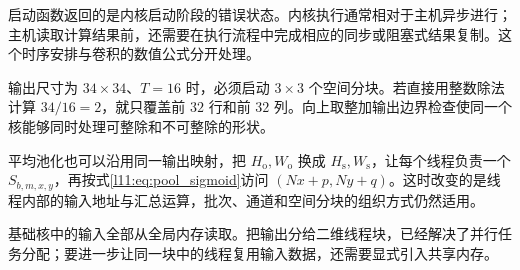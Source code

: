 \noindent\begin{minipage}{\linewidth}

\end{minipage}

启动函数返回的是内核启动阶段的错误状态。内核执行通常相对于主机异步进行；主机读取计算结果前，还需要在执行流程中完成相应的同步或阻塞式结果复制。这个时序安排与卷积的数值公式分开处理。

输出尺寸为 $34\times34$、$T=16$ 时，必须启动 $3\times3$ 个空间分块。若直接用整数除法计算 $34/16=2$，就只覆盖前 $32$ 行和前 $32$ 列。向上取整加输出边界检查使同一个核能够同时处理可整除和不可整除的形状。

平均池化也可以沿用同一输出映射，把 $H_{\mathrm{o}},W_{\mathrm{o}}$ 换成 $H_{\mathrm{s}},W_{\mathrm{s}}$，让每个线程负责一个 $S_{b,m,x,y}$，再按式\eqref{l11:eq:pool_sigmoid}访问 $(Nx+p,Ny+q)$。这时改变的是线程内部的输入地址与汇总运算，批次、通道和空间分块的组织方式仍然适用。

基础核中的输入全部从全局内存读取。把输出分给二维线程块，已经解决了并行任务分配；要进一步让同一块中的线程复用输入数据，还需要显式引入共享内存。
